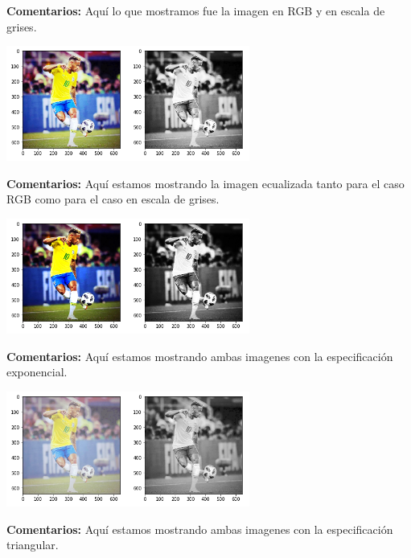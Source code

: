 \documentclass[11pt]{article}
\begin{document}
\textbf{Comentarios:} Aquí lo que mostramos fue la imagen en RGB y en escala de grises. \\

\begin{center}
\includegraphics[width=0.6\textwidth]{./figures/neymar_ecualizado}
\end{center}

\textbf{Comentarios:} Aquí estamos mostrando la imagen ecualizada tanto para el caso RGB como para el caso en escala de grises. \\

\begin{center}
\includegraphics[width=0.6\textwidth]{./figures/neymar_exponencial}
\end{center}

\textbf{Comentarios:} Aquí estamos mostrando ambas imagenes con la especificación exponencial. \\

\begin{center}
\includegraphics[width=0.6\textwidth]{./figures/neymar_triangular}
\end{center}

\textbf{Comentarios:} Aquí estamos mostrando ambas imagenes con la especificación triangular. \\
\end{document}

